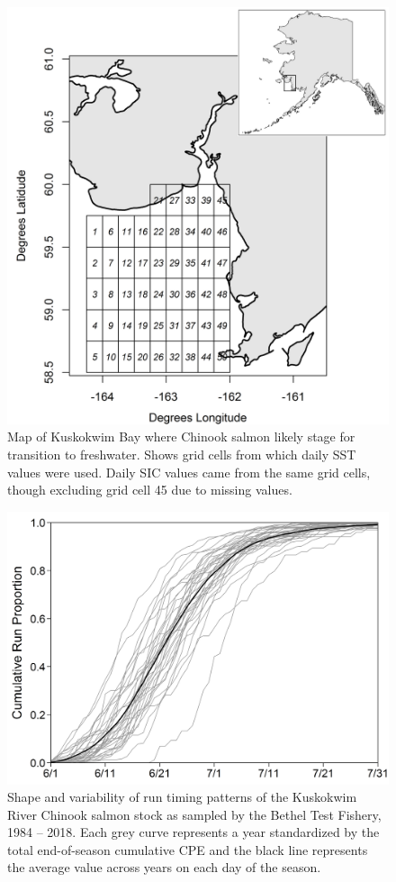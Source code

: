 \documentclass[12pt,]{book}
\theoremstyle{definition}
\theoremstyle{definition}
\theoremstyle{definition}
\theoremstyle{remark}
\begin{document}
\clearpage

\begin{figure}
  \centering
  \includegraphics{img/Ch2/map.png}
  \caption{Map of Kuskokwim Bay where Chinook salmon likely stage for transition to freshwater. Shows grid cells from which daily SST values were used. Daily SIC values came from the same grid cells, though excluding grid cell 45 due to missing values.}
  \label{fig:ch2-map}
\end{figure}

\clearpage

\begin{figure}
  \centering
  \includegraphics{img/Ch2/p-ccpue.png}
  \caption{Shape and variability of run timing patterns of the Kuskokwim River Chinook salmon stock as sampled by the Bethel Test Fishery, 1984 -- 2018. Each grey curve represents a year standardized by the total end-of-season cumulative CPE and the black line represents the average value across years on each day of the season.}
  \label{fig:p-ccpue}
\end{figure}
\end{document}
